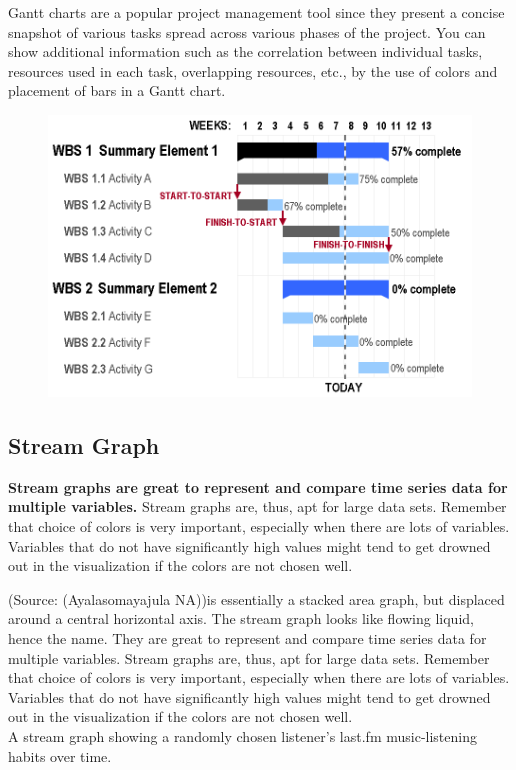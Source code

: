 \documentclass[]{book}
\begin{document}
Gantt charts are a popular project management tool since they present a
concise snapshot of various tasks spread across various phases of the
project. You can show additional information such as the correlation
between individual tasks, resources used in each task, overlapping
resources, etc., by the use of colors and placement of bars in a Gantt
chart.

\begin{figure}
\centering
\includegraphics{images/aya-gantt.png}
\caption{}
\end{figure}

\subsection{Stream Graph}\label{stream-graph}

\textbf{Stream graphs are great to represent and compare time series
data for multiple variables.} Stream graphs are, thus, apt for large
data sets. Remember that choice of colors is very important, especially
when there are lots of variables. Variables that do not have
significantly high values might tend to get drowned out in the
visualization if the colors are not chosen well.

(Source: (Ayalasomayajula NA))is essentially a stacked area graph, but
displaced around a central horizontal axis. The stream graph looks like
flowing liquid, hence the name. They are great to represent and compare
time series data for multiple variables. Stream graphs are, thus, apt
for large data sets. Remember that choice of colors is very important,
especially when there are lots of variables. Variables that do not have
significantly high values might tend to get drowned out in the
visualization if the colors are not chosen well.\\
A stream graph showing a randomly chosen listener's last.fm
music-listening habits over time.
\end{document}
